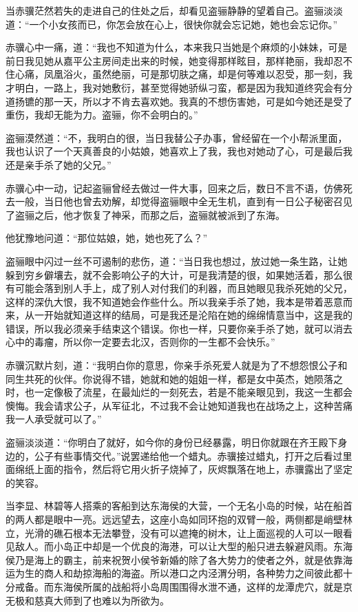 当赤骥茫然若失的走进自己的住处之后，却看见盗骊静静的望着自己。盗骊淡淡道：“一个小女孩而已，你怎会放在心上，很快你就会忘记她，她也会忘记你。”

赤骥心中一痛，道：“我也不知道为什么，本来我只当她是个麻烦的小妹妹，可是前日我见她从嘉平公主房间走出来的时候，她变得那样眩目，那样艳丽，我却忍不住心痛，凤凰浴火，虽然绝丽，可是那切肤之痛，却是何等难以忍受，那一刻，我才明白，一路上，我对她敷衍，甚至觉得她骄纵刁蛮，都是因为我知道终究会有分道扬镳的那一天，所以才不肯去喜欢她。我真的不想伤害她，可是如今她还是受了重伤，我却无能为力。盗骊，你不会明白的。”

盗骊漠然道：“不，我明白的很，当日我替公子办事，曾经留在一个小帮派里面，我也认识了一个天真善良的小姑娘，她喜欢上了我，我也对她动了心，可是最后我还是亲手杀了她的父兄。”

赤骥心中一动，记起盗骊曾经去做过一件大事，回来之后，数日不言不语，仿佛死去一般，当日他也曾去劝解，却觉得盗骊眼中全无生机，直到有一日公子秘密召见了盗骊之后，他才恢复了神采，而那之后，盗骊就被派到了东海。

他犹豫地问道：“那位姑娘，她，她也死了么？”

盗骊眼中闪过一丝不可遏制的悲伤，道：“当日我也想过，放过她一条生路，让她躲到穷乡僻壤去，就不会影响公子的大计，可是我清楚的很，如果她活着，那么很有可能会落到别人手上，成了别人对付我们的利器，而且她眼见我杀死她的父兄，这样的深仇大恨，我不知道她会作些什么。所以我亲手杀了她，我本是带着恶意而来，从一开始就知道这样的结局，可是我还是沦陷在她的绵绵情意当中，这是我的错误，所以我必须亲手结束这个错误。你也一样，只要你亲手杀了她，就可以消去心中的毒瘤，所以你一定要去北汉，否则你的一生都不会快乐。”

赤骥沉默片刻，道：“我明白你的意思，你亲手杀死爱人就是为了不想怨恨公子和同生共死的伙伴。你说得不错，她就和她的姐姐一样，都是女中英杰，她陨落之时，也一定像极了流星，在最灿烂的一刻死去，若是不能亲眼见到，我这一生都会懊悔。我会请求公子，从军征北，不过我不会让她知道我也在战场之上，这种苦痛我一人承受就可以了。”

盗骊淡淡道：“你明白了就好，如今你的身份已经暴露，明日你就跟在齐王殿下身边的，公子有些事情交代。”说罢递给他一个蜡丸。赤骥接过蜡丸，打开之后看过里面绵纸上面的指令，然后将它用火折子烧掉了，灰烬飘落在地上，赤骥露出了坚定的笑容。

当李显、林碧等人搭乘的客船到达东海侯的大营，一个无名小岛的时候，站在船首的两人都是眼中一亮。远远望去，这座小岛如同环抱的双臂一般，两侧都是峭壁林立，光滑的礁石根本无法攀登，没有可以遮掩的树木，让上面巡视的人可以一眼看见敌人。而小岛正中却是一个优良的海港，可以让大型的船只进去躲避风雨。东海侯乃是海上的霸主，前来祝贺小侯爷新婚的除了各大势力的使者之外，就是依靠海运为生的商人和劫掠海船的海盗。所以港口之内泾渭分明，各种势力之间彼此都十分戒备。而东海侯所属的战船将小岛周围围得水泄不通，这样的龙潭虎穴，就是京无极和慈真大师到了也难以为所欲为。

